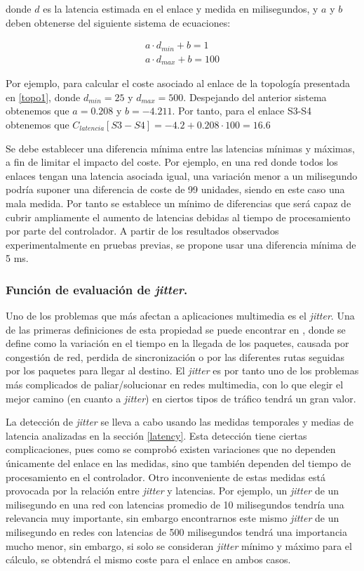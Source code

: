 \documentclass[a4paper,11pt]{book}
\begin{document}
 donde $d$ es la latencia estimada en el enlace y medida en milisegundos, y $a$ y $b$ deben obtenerse del siguiente sistema de ecuaciones:
 
 \begin{eqnarray}
   a \cdot d_{min} + b=1\\\nonumber
   a \cdot d_{max} + b=100
 \label{ec:clatencia-lin-sis}
\end{eqnarray} 

 Por ejemplo, para calcular el coste asociado al enlace de la topología presentada en \ref{topo1}, donde $d_{min}=25$ y $d_{max}=500$. Despejando del anterior sistema obtenemos que $a=0.208$ y $b=-4.211$. Por tanto, para el enlace S3-S4 obtenemos que $C_{latencia}[S3-S4]= -4.2 + 0.208 \cdot 100=16.6$
 
 Se debe establecer una diferencia mínima entre las latencias mínimas y máximas, a fin de limitar el impacto del coste. Por ejemplo, en una red donde todos los enlaces tengan una latencia asociada igual, una variación menor a un milisegundo podría suponer una diferencia de coste de 99 unidades, siendo en este caso una mala medida. Por tanto se establece un mínimo de diferencias que será capaz de cubrir ampliamente el aumento de latencias debidas al tiempo de procesamiento por parte del controlador. A partir de los resultados observados experimentalmente en pruebas previas, se propone usar una diferencia mínima de 5 ms.

%
\subsubsection{Función de evaluación de \textit{jitter}.}

Uno de los problemas que más afectan a aplicaciones multimedia es el \textit{jitter}. Una de las primeras definiciones de esta propiedad se puede encontrar en \cite{berriman1996jitter}, donde se define como la variación en el tiempo en la llegada de los paquetes, causada por congestión de red, perdida de sincronización o por las diferentes rutas seguidas por los paquetes para llegar al destino. El \textit{jitter} es por tanto uno de los problemas más complicados de paliar/solucionar en redes multimedia, con lo que elegir el mejor camino (en cuanto a \textit{jitter}) en ciertos tipos de tráfico tendrá un gran valor.

La detección de \textit{jitter} se lleva a cabo usando las medidas temporales y medias de latencia analizadas en la sección \ref{latency}. Esta detección tiene ciertas complicaciones, pues como se comprobó existen variaciones que no dependen únicamente del enlace en las medidas, sino que también dependen del tiempo de procesamiento en el controlador. Otro inconveniente de estas medidas está provocada por la relación entre \textit{jitter} y latencias. Por ejemplo, un \textit{jitter} de un milisegundo en una red con latencias promedio de 10 milisegundos tendría una relevancia muy importante, sin embargo encontrarnos este mismo \textit{jitter} de un milisegundo en redes con latencias de 500 milisegundos tendrá una importancia mucho menor, sin embargo, si solo se consideran \textit{jitter} mínimo y máximo para el cálculo, se obtendrá el mismo coste para el enlace en ambos casos.
\end{document}
